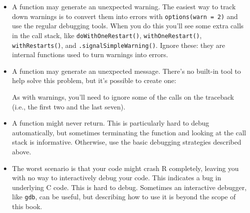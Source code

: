 \begin{itemize}
\item
  A function may generate an unexpected warning. The easiest way to
  track down warnings is to convert them into errors with
  \texttt{options(warn = 2)} and use the regular debugging tools. When
  you do this you'll see some extra calls in the call stack, like
  \texttt{doWithOneRestart()}, \texttt{withOneRestart()},
  \texttt{withRestarts()}, and \texttt{.signalSimpleWarning()}. Ignore
  these: they are internal functions used to turn warnings into errors.
\item
  A function may generate an unexpected message. There's no built-in
  tool to help solve this problem, but it's possible to create one:

\begin{Shaded}
\begin{Highlighting}[]
\StringTok{ }
   
\NormalTok{\}}

\StringTok{ }\NormalTok{()}
\StringTok{ }\NormalTok{(}\NormalTok{)}
\NormalTok{()}
\NormalTok{(}\NormalTok{())}
\NormalTok{()}
\end{Highlighting}
\end{Shaded}

  As with warnings, you'll need to ignore some of the calls on the
  traceback (i.e., the first two and the last seven).
\item
  A function might never return. This is particularly hard to debug
  automatically, but sometimes terminating the function and looking at
  the call stack is informative. Otherwise, use the basic debugging
  strategies described above.
\item
  The worst scenario is that your code might crash R completely, leaving
  you with no way to interactively debug your code. This indicates a bug
  in underlying C code. This is hard to debug. Sometimes an interactive
  debugger, like \texttt{gdb}, can be useful, but describing how to use
  it is beyond the scope of this book. 


\end{itemize}
